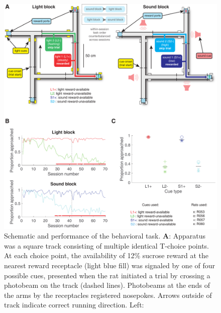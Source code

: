 \documentclass[11pt]{article}
\newcommand{\bsf}[1]{\textbf{#1}}
\providecommand{\DIFadd}[1]{{\protect\color{red} \sf #1}} %
\providecommand{\DIFdel}[1]{} %
\providecommand{\DIFaddFL}[1]{\DIFadd{#1}} %
\providecommand{\DIFdelFL}[1]{\DIFdel{#1}} %
\providecommand{\DIFaddbeginFL}{} %
\providecommand{\DIFaddendFL}{} %
\providecommand{\DIFdelbeginFL}{} %
\providecommand{\DIFdelendFL}{} %
\newcommand{\DIFscaledelfig}{0.5}
\newlength{\DIFdelgraphicswidth} %
\newlength{\DIFdelgraphicsheight} %
\newcommand{\DIFaddincludegraphics}[2][]{{\color{red}\fbox{\DIFOincludegraphics[#1]{#2}}}} %
\newcommand{\DIFdelincludegraphics}[2][]{%
\sbox{\DIFdelgraphicsbox}{\DIFOincludegraphics[#1]{#2}}%
\settoboxwidth{\DIFdelgraphicswidth}{\DIFdelgraphicsbox} %
\settoboxtotalheight{\DIFdelgraphicsheight}{\DIFdelgraphicsbox} %
\scalebox{\DIFscaledelfig}{%
\parbox[b]{\DIFdelgraphicswidth}{\usebox{\DIFdelgraphicsbox}\\[-\baselineskip] \rule{\DIFdelgraphicswidth}{0em}}\llap{\resizebox{\DIFdelgraphicswidth}{\DIFdelgraphicsheight}{%
\setlength{\unitlength}{\DIFdelgraphicswidth}%
\begin{picture}(1,1)%
\thicklines\linethickness{2pt} %
{\color[rgb]{1,0,0}\put(0,0){\framebox(1,1){}}}%
{\color[rgb]{1,0,0}\put(0,0){\line( 1,1){1}}}%
{\color[rgb]{1,0,0}\put(0,1){\line(1,-1){1}}}%
\end{picture}%
}\hspace*{3pt}}} %
} %
\DeclareRobustCommand{\DIFaddbeginFL}{\DIFOaddbeginFL \let\includegraphics\DIFaddincludegraphics} %
\DeclareRobustCommand{\DIFaddendFL}{\DIFOaddendFL \let\includegraphics\DIFOincludegraphics} %
\DeclareRobustCommand{\DIFdelbeginFL}{\DIFOdelbeginFL \let\includegraphics\DIFdelincludegraphics} %
\DeclareRobustCommand{\DIFdelendFL}{\DIFOaddendFL \let\includegraphics\DIFOincludegraphics} %
\begin{document}
 \begin{figure}[ht!]
\centering
\DIFdelbeginFL %
\DIFdelendFL \DIFaddbeginFL \includegraphics[height=0.7\textheight]{Fig 2 - Behavioral schematic and results.pdf}
\DIFaddendFL \caption{Schematic \DIFaddbeginFL \DIFaddFL{and performance }\DIFaddendFL of \DIFaddbeginFL \DIFaddFL{the }\DIFaddendFL behavioral task. \bsf{A}: \DIFdelbeginFL \DIFdelFL{To scale depiction of }\DIFdelendFL \DIFaddbeginFL \DIFaddFL{Apparatus was a }\DIFaddendFL square track consisting of multiple identical T-choice points. At each choice point, the availability of 12\% sucrose reward at the nearest reward receptacle (light blue fill) was signaled by one of four possible cues, presented when the rat initiated a trial by crossing a photobeam on the track (dashed lines). Photobeams at the ends of the arms by the receptacles registered \DIFdelbeginFL \DIFdelFL{Nosepokes (solid lines)}\DIFdelendFL \DIFaddbeginFL \DIFaddFL{nosepokes}\DIFaddendFL . \DIFdelbeginFL \DIFdelFL{Rectangular boxes with yellow fill indicate location of LEDs used
for light cues. Speakers for tone cues were placed underneath the choice
points, indicated by magenta fill on track. }\DIFdelendFL Arrows outside of track indicate correct running direction. \DIFdelbeginFL \DIFdelFL{Circle in the center indicates location of pedestal during pre- and post-records. Scale bar is located beneath the track. \bsf{B}}\DIFdelendFL \DIFaddbeginFL \DIFaddFL{Left}\DIFaddendFL : \DIFdelbeginFL \DIFdelFL{Progression of
}}
\end{figure}
\end{document}
